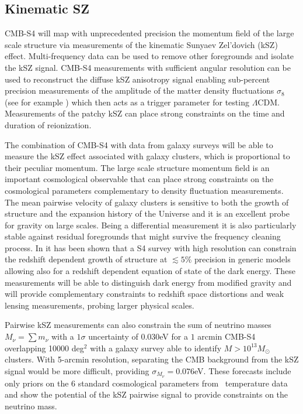 \subsection{Kinematic SZ}

CMB-S4 will map with unprecedented precision the momentum field of the large scale structure via measurements of the kinematic Sunyaev Zel'dovich (kSZ) effect. Multi-frequency data can be used to remove other foregrounds and isolate the kSZ signal. CMB-S4 measurements with sufficient angular resolution can be used to reconstruct the diffuse kSZ anisotropy signal enabling sub-percent precision measurements of the amplitude of the matter density fluctuations $\sigma_8$ (see for example \cite{Calabrese:2014gwa}) which then acts as a trigger
parameter for testing $\Lambda$CDM. 
Measurements of the patchy kSZ can place strong constraints on the time and duration of reionization.

The combination of CMB-S4 with data from galaxy surveys will be able to measure the kSZ effect associated with galaxy clusters, which is proportional to their peculiar momentum. The large scale structure momentum field is an important cosmological observable that can place strong constraints on the cosmological parameters \cite{Bhattacharya:2007sk,Kosowsky:2009nc,Mueller:2014nsa,Mueller:2014dba} complementary to density fluctuation measurements. The mean pairwise velocity of galaxy clusters is sensitive to both the growth of structure and the expansion history of the Universe and it is an excellent probe for gravity on large scales. Being a differential measurement it is also particularly stable against residual foregrounds that might survive the frequency cleaning process. In \cite{Mueller:2014nsa,Mueller:2014dba} it has been shown that a S4 survey with high resolution can constrain the redshift dependent growth of structure at $\lesssim 5\%$ precision in generic models allowing also for a redshift dependent equation of state of the dark energy. These measurements will be able to distinguish dark energy from modified gravity and will provide complementary constraints to redshift space distortions and weak lensing measurements, probing larger physical scales.

Pairwise kSZ measurements can also constrain the sum of neutrino masses $M_{\nu}= \sum m_{\nu}$ with a $1\sigma$ uncertainty of $0.030$eV for a $1$ arcmin CMB-S4 overlapping 10000 deg$^2$ with a galaxy survey able to identify $M>10^{13}M_{\odot}$ clusters. With 5-arcmin resolution, separating the CMB background from the kSZ signal would be more difficult, providing  $\sigma_{M_{\nu}} = 0.076$eV. These forecasts include only priors on the 6 standard cosmological parameters from \planck\ temperature data and show the potential of the kSZ pairwise signal to provide constraints on the neutrino mass. 

